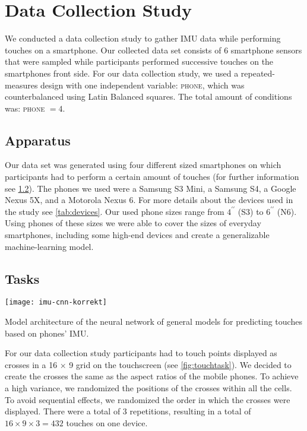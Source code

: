\section{Data Collection Study}
We conducted a data collection study to gather IMU data while performing touches on a smartphone.
Our collected data set consists of 6 smartphone sensors that were sampled while participants performed successive touches on the smartphones front side. 
For our data collection study, we used a repeated-measures design with one independent variable: \textsc{phone}, which was counterbalanced using Latin Balanced squares. 
The total amount of conditions was: \textsc{phone} $ = 4$.

\subsection{Apparatus}
Our data set was generated using four different sized smartphones on which participants had to perform a certain amount of touches (for further information see \cref{sec:tasks}).
The phones we used were a Samsung S3 Mini, a Samsung S4, a Google Nexus 5X, and a Motorola Nexus 6.
For more details about the devices used in the study see \cref{tab:devices}.
Our used phone sizes range from $ 4^{\prime\prime} $ (S3) to $ 6^{\prime\prime} $ (N6). 
Using phones of these sizes we were able to cover the sizes of everyday smartphones, including some high-end devices and create a generalizable machine-learning model.



\subsection{Tasks}
\label{sec:tasks}
\begin{marginfigure}
	\vspace{-3.5cm}
	\texttt{[image: imu-cnn-korrekt]}
	\caption[Model architecture]{Model architecture of the neural network of general models for predicting touches based on phones' IMU.}
	\label{fig:model_architecture}
\end{marginfigure}
For our data collection study participants had to touch points displayed as crosses in a 16 $ \times $ 9 grid on the touchscreen (see \cref{fig:touchtask}). 
We decided to create the crosses the same as the aspect ratios of the mobile phones.
To achieve a high variance, we randomized the positions of the crosses within all the cells.
To avoid sequential effects, we randomized the order in which the crosses were displayed.
There were a total of 3 repetitions, resulting in a total  of $ 16 \times 9 \times 3 = 432 $ touches on one device.

